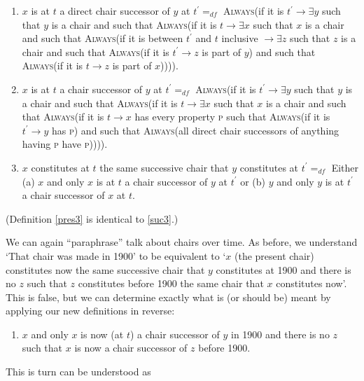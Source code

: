 \documentclass[12pt,twoside]{reedfancy}
\begin{document}
\begin{spacing}{1.25}
\begin{enumerate}[label=\arabic*a., ref=\arabic*a]
  \item $x$ is at $t$ a direct chair successor of $y$ at $t^{\prime}
    =_{df}$ \textsc{Always}(if it is $t^{\prime} \rightarrow \exists
    y$ such that $y$ is a chair and such that \textsc{Always}(if it is
    $t \rightarrow \exists x$ such that $x$ is a chair and such that
    \textsc{Always}(if it is between $t^{\prime}$ and $t$ inclusive
    $\rightarrow \exists z$ such that $z$ is a chair and such that
    \textsc{Always}(if it is $t^{\prime} \rightarrow z$ is part of
    $y$) and such that \textsc{Always}(if it is $t \rightarrow z$ is
    part of $x$)))). \label{pres1}
  \item $x$ is at $t$ a chair successor of $y$ at $t^{\prime} =_{df}$
    \textsc{Always}(if it is $t^{\prime} \rightarrow \exists y$ such
    that $y$ is a chair and such that \textsc{Always}(if it is $t
    \rightarrow \exists x$ such that $x$ is a chair and such that
    \textsc{Always}(if it is $t \rightarrow x$ has every property
    \textsc{p} such that \textsc{Always}(if it is $t^{\prime}
    \rightarrow y$ has \textsc{p}) and such that \textsc{Always}(all
    direct chair successors of anything having \textsc{p} have
    \textsc{p})))). \label{pres2}
  \item $x$ constitutes at $t$ the same successive chair that $y$
    constitutes at $t^{\prime} =_{df}$ Either (a) $x$ and only $x$ is
    at $t$ a chair successor of $y$ at $t^{\prime}$ or (b) $y$ and
    only $y$ is at $t^{\prime}$ a chair successor of $x$ at
    $t$. \label{pres3}
\end{enumerate}
(Definition \ref{pres3} is identical to \ref{suc3}.)

We can again ``paraphrase'' talk about chairs over time.  As before,
we understand `That chair was made in 1900' to be equivalent to `$x$
(the present chair) constitutes now the same successive chair that $y$
constitutes at 1900 and there is no $z$ such that $z$ constitutes
before 1900 the same chair that $x$ constitutes now'.  This is false,
but we can determine exactly what is (or should be) meant by applying
our new definitions in reverse:

\begin{enumerate}[label=3a.]
  \item $x$ and only $x$ is now (at $t$) a chair successor of $y$ in
    1900 and there is no $z$ such that $x$ is now a chair successor of
    $z$ before 1900.
\end{enumerate}
This is turn can be understood as


\end{spacing}
\end{document}

